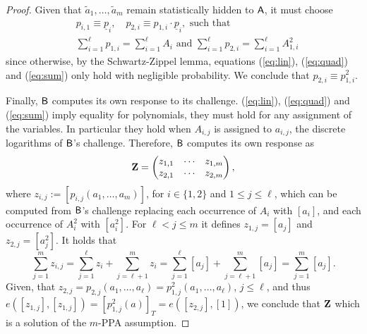 \begin{proof}
Given that $\tilde{a}_{1},\ldots,\tilde{a}_{m}$ remain statistically hidden to $\mathsf{A}$, it must choose
\begin{align*}
&p_{i,1}\equiv \underline{p}_i, \quad p_{2,i}\equiv p_{1,i}\cdot \underline{p}_i,\text{ such that }\\
&\sum_{i=1}^\ell p_{1,i} = \sum_{i=1}^\ell A_{i} \text{ and } \sum_{i=1}^\ell p_{2,i} = \sum_{i=1}^\ell A_{1,i}^2
\end{align*}
since otherwise, by the Schwartz-Zippel lemma, equations (\ref{eq:lin}), (\ref{eq:quad}) and (\ref{eq:sum}) only hold with negligible probability. We conclude that $p_{2,i}\equiv p^2_{1,i}$.

Finally, $\mathsf{B}$ computes its own response to its challenge. (\ref{eq:lin}), (\ref{eq:quad}) and (\ref{eq:sum}) imply equality for polynomials, they must hold for any assignment of the variables. In particular they hold when $A_{i,j}$ is assigned to $a_{i,j}$, the discrete logarithms of $\mathsf{B}$'s challenge. Therefore, $\mathsf{B}$ computes its own response as
$$
\mathbf{{Z}} = \begin{pmatrix}
	z_{1,1}&\cdots&z_{1,m}\\z_{2,1}&\cdots&z_{2,m}
\end{pmatrix},
$$
where $z_{i,j} := [p_{i,j}(a_{1},\ldots,a_m)]$, for $i\in\{1,2\}$ and $1\leq j \leq \ell$, which can be computed from $\mathsf{B}$'s challenge replacing each occurrence of $A_i$ with $[a_i]$, and each occurrence of $A_i^2$ with  $[a_i^2]$. For $\ell < j\leq m$ it defines $z_{1,j} = [a_j]$ and $z_{2,j} = [a_j^2]$. It holds that
$$
\sum_{j=1}^m z_{i,j} = \sum_{j=1}^\ell z_i + \sum_{j=\ell+1}^m z_i = \sum_{j=1}^\ell [a_j] + \sum_{j=\ell+1}^m [a_j] = \sum_{j=1}^m [a_j].
$$
Given, that $z_{2,j} = p_{2,j}(a_1,\ldots,a_\ell) = p_{1,j}^2(a_1,\ldots,a_\ell)$, $j\leq \ell$, and thus $e([z_{1,j}],[z_{1,j}]) = [p_{1,j}^2(a)]_T = e([z_{2,j}],[1])$, we conclude that  $\mathbf{{Z}}$ which is a solution of the $m$-PPA assumption.
\end{proof}

